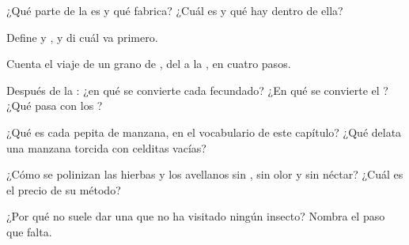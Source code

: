 \begin{exercise}[$\star$]\label{exo:g5:flower-to-fruit:1}
¿Qué parte de la  es  y qué fabrica? ¿Cuál es  y
qué hay dentro de ella?
\end{exercise}

\begin{exercise}[$\star$]\label{exo:g5:flower-to-fruit:2}
Define  y , y di cuál va primero.
\end{exercise}

\begin{exercise}[$\star$]\label{exo:g5:flower-to-fruit:3}
Cuenta el viaje de un grano de , del  a la 
, en cuatro pasos.
\end{exercise}

\begin{exercise}[$\star$]\label{exo:g5:flower-to-fruit:4}
Después de la : ¿en qué se convierte cada  fecundado?
¿En qué se convierte el ? ¿Qué pasa con los ?
\end{exercise}

\begin{exercise}[$\star$]\label{exo:g5:flower-to-fruit:5}
¿Qué es cada pepita de manzana, en el vocabulario de este capítulo?
¿Qué delata una manzana torcida con celditas vacías?
\end{exercise}

\begin{exercise}[$\star$]\label{exo:g5:flower-to-fruit:6}
¿Cómo se polinizan las hierbas y los avellanos sin , sin olor y
sin néctar? ¿Cuál es el precio de su método?
\end{exercise}

\begin{exercise}[$\star$]\label{exo:g5:flower-to-fruit:7}
¿Por qué no suele dar  una  que no ha visitado ningún
insecto? Nombra el paso que falta.
\end{exercise}

